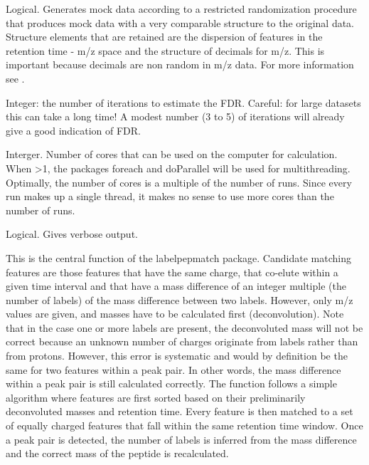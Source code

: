 \documentclass[letterpaper]{book}
\begin{document}
\begin{Arguments}
\begin{ldescription}
\item[\code{FDR}] Logical. Generates mock data according to a restricted randomization procedure that produces mock data with a very comparable structure to the original data. Structure elements that are retained are the dispersion of features in the retention time - m/z space and the structure of decimals for m/z. This is important because decimals are non random in m/z data. For more information see .

\item[\code{iterations}] Integer: the number of iterations to estimate the FDR. Careful: for large datasets this can take a long time! A modest number (3 to 5) of iterations will already give a good indication of FDR.

\item[\code{cores}] Interger. Number of cores that can be used on the computer for calculation. When >1, the packages foreach and doParallel will be used for multithreading. Optimally, the number of cores is a multiple of the number of runs. Since every run makes up a single thread, it makes no sense to use more cores than the number of runs.

\item[\code{verbose}] Logical. Gives verbose output.
\end{ldescription}
\end{Arguments}
%
\begin{Details}\relax
This is the central function of the labelpepmatch package. Candidate matching features are those features that have the same charge, that co-elute within a given time interval and that have a mass difference of an integer multiple (the number of labels) of the mass difference between two labels. However, only m/z values are given, and masses have to be calculated first (deconvolution). Note that in the case one or more labels are present, the deconvoluted mass will not be correct because an unknown number of charges originate from labels rather than from protons. However, this error is systematic and would by definition be the same for two features within a peak pair. In other words, the mass difference within a peak pair is still calculated correctly. The function follows a simple algorithm where features are first sorted based on their preliminarily deconvoluted masses and retention time. Every feature is then matched to a set of equally charged features that fall within the same retention time window. Once a peak pair is detected, the number of labels is inferred from the mass difference and the correct mass of the peptide is recalculated.
\end{Details}
\end{document}
